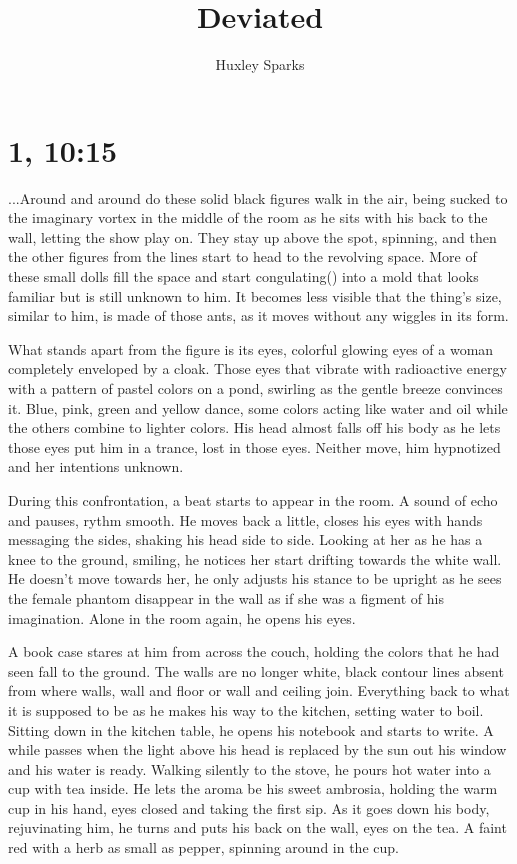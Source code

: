 \title{Deviated}
\author{Huxley Sparks}
\section{1, 10:15}
	
	...Around and around do these solid black figures walk in the air, being sucked to the imaginary vortex in the middle of the room as he sits
	with his back to the wall, letting the show play on. They stay up above the spot, spinning, and then the other figures from the lines start
	to head to the revolving space. More of these small dolls fill the space and start congulating() into a mold that looks familiar but is still
	unknown to him. It becomes less visible that the thing's size, similar to him, is made of those ants, as it moves without any wiggles in
	its form.

		What stands apart from the figure is its eyes, colorful glowing eyes of a woman completely enveloped by a cloak. Those eyes that
	vibrate with radioactive energy with a pattern of pastel colors on a pond, swirling as the gentle breeze convinces it. Blue, pink, green and 
	yellow dance, some colors acting like water and oil while the others combine to lighter colors. His head almost falls off his body as he lets
	those eyes put him in a trance, lost in those eyes. Neither move, him hypnotized and her intentions unknown.

		During this confrontation, a beat starts to appear in the room. A sound of echo and pauses, rythm smooth. He moves back a little, 
	closes his eyes with hands messaging the sides, shaking his head side to side. Looking at her as he has a knee to the ground, smiling, he
	notices her start drifting towards the white wall. He doesn't move towards her, he only adjusts his stance to be upright as he sees the
	female phantom disappear in the wall as if she was a figment of his imagination. Alone in the room again, he opens his eyes.

		A book case stares at him from across the couch, holding the colors that he had seen fall to the ground. The walls are no longer
	white, black contour lines absent from where walls, wall and floor or wall and ceiling join. Everything back to what it is supposed to be as
	he makes his way to the kitchen, setting water to boil. Sitting down in the kitchen table, he opens his notebook and starts to write. A while
	passes when the light above his head is replaced by the sun out his window and his water is ready. Walking silently to the stove, he pours
	hot water into a cup with tea inside. He lets the aroma be his sweet ambrosia, holding the warm cup in his hand, eyes closed and taking the
	first sip. As it goes down his body, rejuvinating him, he turns and puts his back on the wall, eyes on the tea. A faint red with a herb as
	small as pepper, spinning around in the cup.

